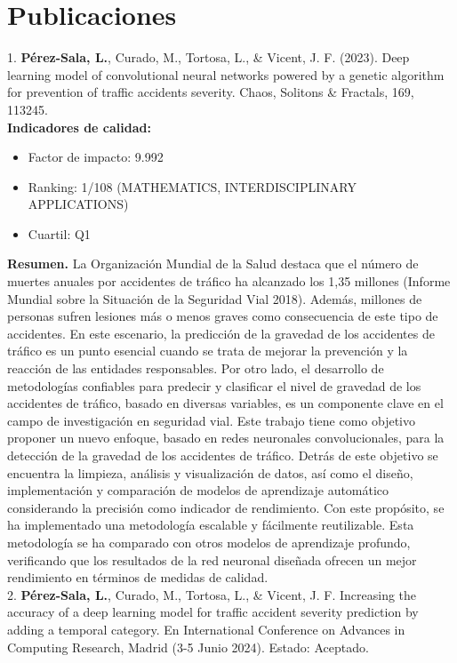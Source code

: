 
\chapter{Publicaciones}

1. \textbf{Pérez-Sala, L.}, Curado, M., Tortosa, L., \& Vicent, J. F. (2023). Deep learning model of convolutional neural networks powered by a genetic algorithm for prevention of traffic accidents severity. Chaos, Solitons \& Fractals, 169, 113245.\\

\textbf{Indicadores de calidad:} 
\begin{itemize}
	\item Factor de impacto: 9.992
	\item Ranking: 1/108 (MATHEMATICS, INTERDISCIPLINARY APPLICATIONS)
	\item Cuartil: Q1
\end{itemize}

\textbf{Resumen.} La Organización Mundial de la Salud destaca que el número de muertes anuales por accidentes de tráfico ha alcanzado los 1,35 millones (Informe Mundial sobre la Situación de la Seguridad Vial 2018). Además, millones de personas sufren lesiones más o menos graves como consecuencia de este tipo de accidentes. En este escenario, la predicción de la gravedad de los accidentes de tráfico es un punto esencial cuando se trata de mejorar la prevención y la reacción de las entidades responsables. Por otro lado, el desarrollo de metodologías confiables para predecir y clasificar el nivel de gravedad de los accidentes de tráfico, basado en diversas variables, es un componente clave en el campo de investigación en seguridad vial. Este trabajo tiene como objetivo proponer un nuevo enfoque, basado en redes neuronales convolucionales, para la detección de la gravedad de los accidentes de tráfico. Detrás de este objetivo se encuentra la limpieza, análisis y visualización de datos, así como el diseño, implementación y comparación de modelos de aprendizaje automático considerando la precisión como indicador de rendimiento.
Con este propósito, se ha implementado una metodología escalable y fácilmente reutilizable. Esta metodología se ha comparado con otros modelos de aprendizaje profundo, verificando que los resultados de la red neuronal diseñada ofrecen un mejor rendimiento en términos de medidas de calidad.\\


2. \textbf{Pérez-Sala, L.}, Curado, M., Tortosa, L., \& Vicent, J. F. Increasing the accuracy of a deep learning model for traffic accident severity prediction by adding a temporal category. En International Conference on Advances in Computing Research, Madrid (3-5 Junio 2024). Estado: Aceptado.\\

